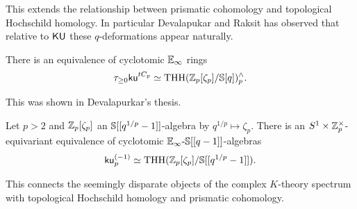 This extends the relationship between prismatic cohomology and topological Hochschild homology. In particular Devalapukar and Raksit has observed that relative to $\mathsf{KU}$ these $q$-deformations appear naturally. 
\begin{conjecture}
    There is an equivalence of cyclotomic $\mathbb{E}_{\infty}$ rings 
    $$\tau_{\geq0}\mathsf{ku}^{tC_{p}}\simeq\mathrm{THH}(\mathbb{Z}_{p}[\zeta_{p}]/\mathbb{S}[q])^{\wedge}_{p}.$$
\end{conjecture}
This was shown in Devalapurkar's thesis.  
\begin{theorem}
    Let $p>2$ and $\mathbb{Z}_{p}[\zeta_{p}]$ an $\mathbb{S}[[q^{1/p}-1]]$-algebra by $q^{1/p}\mapsto\zeta_{p}$. There is an $S^{1}\times\mathbb{Z}_{p}^{\times}$-equivariant equivalence of cyclotomic $\mathbb{E}_{\infty}\text{-}\mathbb{S}[[q-1]]$-algebras 
    $$\mathsf{ku}_{p}^{(-1)}\simeq\mathrm{THH}(\mathbb{Z}_{p}[\zeta_{p}]/\mathbb{S}[[q^{1/p}-1]]).$$
\end{theorem}
This connects the seemingly disparate objects of the complex $K$-theory spectrum with topological Hochschild homology and prismatic cohomology. 

